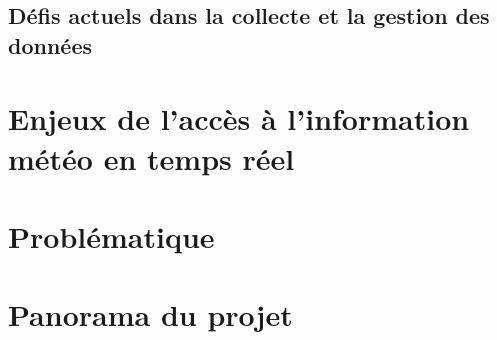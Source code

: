 \clearpage
\subsection{Défis actuels dans la collecte et la gestion des données}
    
\section{Enjeux de l’accès à l’information météo en temps réel}

\section{Problématique}

\section{Panorama du projet}